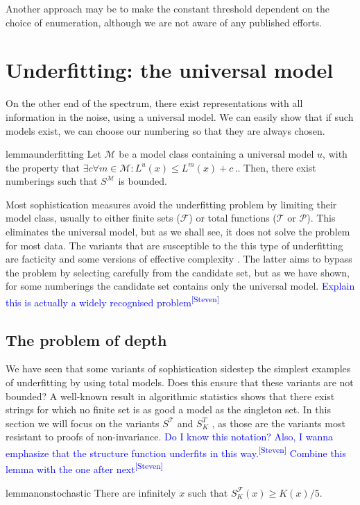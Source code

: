 \documentclass{style/llncs}
\newcommand{\M}{\mathscr M}
\newcommand{\T}{\mathscr T}
\newcommand{\F}{\mathscr F}
\renewcommand{\P}{\mathscr P}
\newcommand{\s}{S}
\newcommand{\p}{\,\text{.}}
\newcommand{\sdr}[1]{\textcolor{blue}{\small #1\textsuperscript{[Steven]} }}
\begin{document}
Another approach may be to make the constant threshold dependent on the choice of enumeration, although we are not aware of any published efforts.

\section{Underfitting: the universal model}
\label{section:underfitting}
On the other end of the spectrum, there exist representations with all information in the noise, using a universal model. We can easily show that if such models exist, we can choose our numbering so that they are always chosen.
\begin{restatable}[underfitting]{lemma}{underfitting}
Let $\M$ be a model class containing a universal model $u$, with the property that $\exists c \forall m \in \M : L^u(x) \leq L^m(x) + c \p$. Then, there exist numberings such that $\s^\M$ is bounded.
\end{restatable}
\noindent Most sophistication measures avoid the underfitting problem by limiting their model class, usually to either finite sets ($\F$) or total functions ($\T$ or $\P$). This eliminates the universal model, but as we shall see, it does not solve the problem for most data. The variants that are susceptible to the this type of underfitting are facticity \cite{adriaans2012facticity} and some versions of effective complexity \cite{gellmann1996information}. The latter aims to bypass the problem by selecting carefully from the candidate set, but as we have shown, for some numberings the candidate set contains only the universal model.
\sdr{Explain this is actually a widely recognised problem}

\subsection{The problem of depth}

We have seen that some variants of sophistication sidestep the simplest examples of underfitting by using total models. Does this ensure that these variants are not bounded? A well-known result in algorithmic statistics shows that there exist strings for which no finite set is as good a model as the singleton set. In this section we will focus on the variants $S^\T$ and $S^T_K$ \cite{vitanyi2004meaningful}, as those are the variants most resistant to proofs of non-invariance.
\sdr{Do I know this notation? Also, I wanna emphasize that the structure function underfits in this way.}
\sdr{Combine this lemma with the one after next}
\begin{restatable}{lemma}{nonstochastic}
There are infinitely  $x$ such that $S^\F_K(x) \geq K(x)/5$. \label{lemma:structure-function-is-not-bounded}
\end{restatable}
\end{document}
